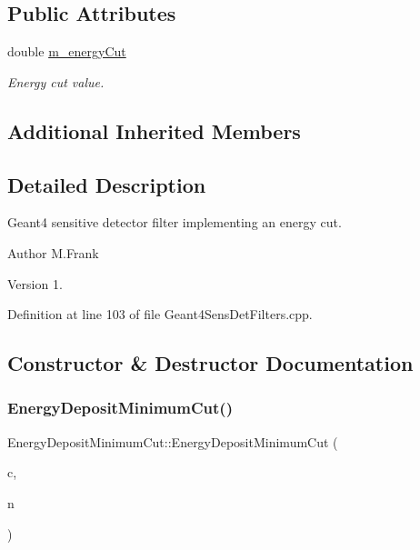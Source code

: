\subsection*{Public Attributes}
\begin{DoxyCompactItemize}
\item 
double \hyperlink{struct_d_d4hep_1_1_simulation_1_1_energy_deposit_minimum_cut_a465b72d5d4e13d7f3555cfdfc1947697}{m\+\_\+energy\+Cut}
\begin{DoxyCompactList}\small\item\em Energy cut value. \end{DoxyCompactList}\end{DoxyCompactItemize}
\subsection*{Additional Inherited Members}


\subsection{Detailed Description}
Geant4 sensitive detector filter implementing an energy cut. 

\begin{DoxyAuthor}{Author}
M.\+Frank 
\end{DoxyAuthor}
\begin{DoxyVersion}{Version}
1. 
\end{DoxyVersion}


Definition at line 103 of file Geant4\+Sens\+Det\+Filters.\+cpp.



\subsection{Constructor \& Destructor Documentation}
\hypertarget{struct_d_d4hep_1_1_simulation_1_1_energy_deposit_minimum_cut_a5abe4000163bf6533035fc26ebfb8642}{}\label{struct_d_d4hep_1_1_simulation_1_1_energy_deposit_minimum_cut_a5abe4000163bf6533035fc26ebfb8642} 
\subsubsection{\texorpdfstring{Energy\+Deposit\+Minimum\+Cut()}{EnergyDepositMinimumCut()}}
{\footnotesize\ttfamily Energy\+Deposit\+Minimum\+Cut\+::\+Energy\+Deposit\+Minimum\+Cut (\begin{DoxyParamCaption}\item[{\hyperlink{class_d_d4hep_1_1_simulation_1_1_geant4_context}{Geant4\+Context} $\ast$}]{c,  }\item[{const std\+::string \&}]{n }\end{DoxyParamCaption})}



